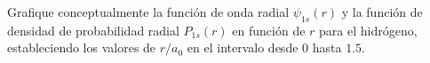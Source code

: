 \item Grafique conceptualmente la función de onda radial $\psi_{1s}(r)$ y la función de densidad de probabilidad radial $P_{1s}(r)$ en función de $r$ para el hidrógeno, estableciendo los valores de $r/a_0$ en el intervalo desde $0$ hasta $1.5$.